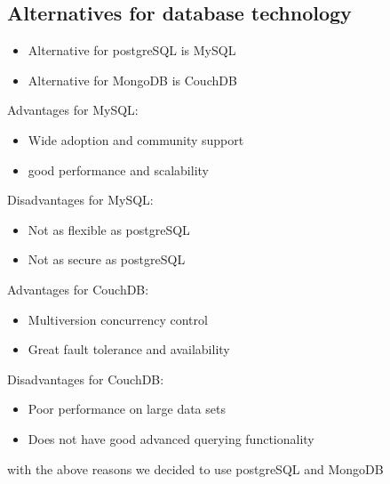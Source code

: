 \documentclass[12pt]{article}
\begin{document}
\subsection{Alternatives for database technology}
\begin{itemize}
    \item Alternative for postgreSQL is MySQL
    \item Alternative for MongoDB is CouchDB
\end{itemize}
Advantages for MySQL:
\begin{itemize}
    \item Wide adoption and community support
    \item good performance and scalability
\end{itemize}
Disadvantages for MySQL:
\begin{itemize}
    \item Not as flexible as postgreSQL
    \item Not as secure as postgreSQL
\end{itemize}
Advantages for CouchDB:
\begin{itemize}
    \item Multiversion concurrency control
    \item Great fault tolerance and availability
\end{itemize}
Disadvantages for CouchDB:
\begin{itemize}
    \item Poor performance on large data sets
    \item Does not have good advanced querying functionality
\end{itemize}
with the above reasons we decided to use postgreSQL and MongoDB
\end{document}
